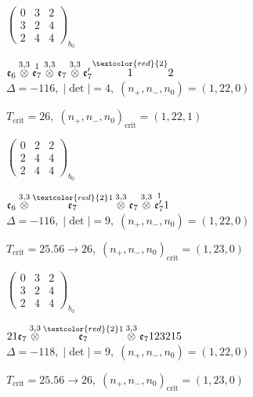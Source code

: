 \documentclass[10pt]{article}
\begin{document}
\hspace{2em}$\left(\begin{smallmatrix}0 & 3 & 2 \\ 3 & 2 & 4 \\ 2 & 4 & 4\end{smallmatrix}\right)_{\!b_0}$

$\mathfrak{e}_6\overset{3,3}{\otimes}\overset{1}{\mathfrak{e}_7}\overset{3,3}{\otimes}\mathfrak{e}_7\overset{3,3}{\otimes}\mathfrak{e}_7'\overset{\textcolor{red}{2}}{1}2$ \quad $\Delta=-116,\; |\det|=4,\; (n_+,n_-,n_0)=(1,22,0)$

\hspace{1em}$T_{\text{crit}}=26,\; (n_+,n_-,n_0)_{\text{crit}}=(1,22,1)$

\hspace{2em}$\left(\begin{smallmatrix}0 & 2 & 2 \\ 2 & 4 & 4 \\ 2 & 4 & 4\end{smallmatrix}\right)_{\!b_0}$

\smallskip

$\mathfrak{e}_6\overset{3,3}{\otimes}\overset{\textcolor{red}{2}1}{\mathfrak{e}_7}\overset{3,3}{\otimes}\mathfrak{e}_7\overset{3,3}{\otimes}\overset{1}{\mathfrak{e}_7'}1$ \quad $\Delta=-116,\; |\det|=9,\; (n_+,n_-,n_0)=(1,22,0)$

\hspace{1em}$T_{\text{crit}}=25.56 \to 26,\; (n_+,n_-,n_0)_{\text{crit}}=(1,23,0)$

\hspace{2em}$\left(\begin{smallmatrix}0 & 3 & 2 \\ 3 & 2 & 4 \\ 2 & 4 & 4\end{smallmatrix}\right)_{\!b_0}$

\smallskip

$21\mathfrak{e}_7\overset{3,3}{\otimes}\overset{\textcolor{red}{2}1}{\mathfrak{e}_7}\overset{3,3}{\otimes}\mathfrak{e}_7123215$ \quad $\Delta=-118,\; |\det|=9,\; (n_+,n_-,n_0)=(1,22,0)$

\hspace{1em}$T_{\text{crit}}=25.56 \to 26,\; (n_+,n_-,n_0)_{\text{crit}}=(1,23,0)$
\end{document}
